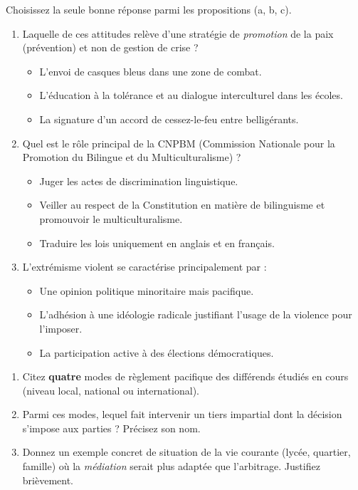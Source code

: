\documentclass[11pt]{article}
\begin{document}
\begin{exercice}
Choisissez la seule bonne réponse parmi les propositions (a, b, c).
\begin{enumerate}
    \item Laquelle de ces attitudes relève d'une stratégie de \textit{promotion} de la paix (prévention) et non de gestion de crise ?
    \begin{itemize}
        \item[a)] L'envoi de casques bleus dans une zone de combat.
        \item[b)] L'éducation à la tolérance et au dialogue interculturel dans les écoles.
        \item[c)] La signature d'un accord de cessez-le-feu entre belligérants.
    \end{itemize}
    \item Quel est le rôle principal de la CNPBM (Commission Nationale pour la Promotion du Bilingue et du Multiculturalisme) ?
    \begin{itemize}
        \item[a)] Juger les actes de discrimination linguistique.
        \item[b)] Veiller au respect de la Constitution en matière de bilinguisme et promouvoir le multiculturalisme.
        \item[c)] Traduire les lois uniquement en anglais et en français.
    \end{itemize}
    \item L'extrémisme violent se caractérise principalement par :
    \begin{itemize}
        \item[a)] Une opinion politique minoritaire mais pacifique.
        \item[b)] L'adhésion à une idéologie radicale justifiant l'usage de la violence pour l'imposer.
        \item[c)] La participation active à des élections démocratiques.
    \end{itemize}
\end{enumerate}
\end{exercice}

\begin{exercice}
\begin{enumerate}
    \item Citez \textbf{quatre} modes de règlement pacifique des différends étudiés en cours (niveau local, national ou international).
    \item Parmi ces modes, lequel fait intervenir un tiers impartial dont la décision s'impose aux parties ? Précisez son nom.
    \item Donnez un exemple concret de situation de la vie courante (lycée, quartier, famille) où la \textit{médiation} serait plus adaptée que l'arbitrage. Justifiez brièvement.
\end{enumerate}
\end{exercice}
\end{document}
